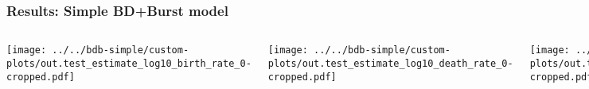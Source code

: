\begin{frame}[t]
    \frametitle{Results: Simple BD+Burst model}
    \begin{columns}[c]

        \begin{minipage}[t][\frametextheight][t]{\columnwidth}
            \begin{center}
                \texttt{[image: ../../bdb-simple/custom-plots/out.test\_estimate\_log10\_birth\_rate\_0-cropped.pdf]}
            \end{center}
        \end{minipage}


        \begin{minipage}[t][\frametextheight][t]{\columnwidth}
            \begin{center}
                \texttt{[image: ../../bdb-simple/custom-plots/out.test\_estimate\_log10\_death\_rate\_0-cropped.pdf]}
            \end{center}
        \end{minipage}


        \begin{minipage}[t][\frametextheight][t]{\columnwidth}
            \begin{center}
                \texttt{[image: ../../bdb-simple/custom-plots/out.test\_estimate\_log10\_expected\_burst\_rate\_0-cropped.pdf]}
            \end{center}
        \end{minipage}

    \end{columns}
\end{frame}
